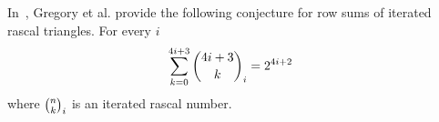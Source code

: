 In~\cite{gregory2023iterated}, Gregory et al.
provide the following conjecture for row sums of iterated rascal triangles.
For every $i$
\begin{align*}
    \sum_{k=0}^{4i+3} \binom{4i+3}{k}_{i} &= 2^{4i+2}
\end{align*}
where $\binom{n}{k}_{i}$ is an iterated rascal number.

